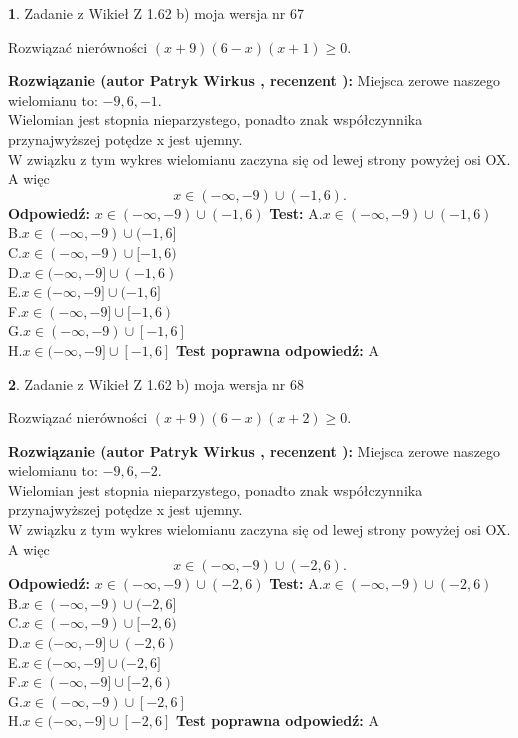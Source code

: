 \documentclass[12pt, a4paper]{article}
\theoremstyle{definition} %
\newtheorem{zad}{}
\newcommand{\zadStart}[1]{\begin{zad}#1\newline}
\newcommand{\zadStop}{\end{zad}}
\newcommand{\rozwStart}[2]{\noindent \textbf{Rozwiązanie (autor #1 , recenzent #2): }\newline}
\newcommand{\rozwStop}{\newline}
\newcommand{\odpStart}{\noindent \textbf{Odpowiedź:}\newline}
\newcommand{\odpStop}{\newline}
\newcommand{\testStart}{\noindent \textbf{Test:}\newline}
\newcommand{\testStop}{\newline}
\newcommand{\kluczStart}{\noindent \textbf{Test poprawna odpowiedź:}\newline}
\newcommand{\kluczStop}{\newline}
\begin{document}
\zadStart{Zadanie z Wikieł Z 1.62 b) moja wersja nr 67}

Rozwiązać nierówności $(x+9)(6-x)(x+1)\ge0$.
\zadStop
\rozwStart{Patryk Wirkus}{}
Miejsca zerowe naszego wielomianu to: $-9, 6, -1$.\\
Wielomian jest stopnia nieparzystego, ponadto znak współczynnika przy\linebreak najwyższej potędze x jest ujemny.\\ W związku z tym wykres wielomianu zaczyna się od lewej strony powyżej osi OX. A więc $$x \in (-\infty,-9) \cup (-1,6).$$
\rozwStop
\odpStart
$x \in (-\infty,-9) \cup (-1,6)$
\odpStop
\testStart
A.$x \in (-\infty,-9) \cup (-1,6)$\\
B.$x \in (-\infty,-9) \cup (-1,6]$\\
C.$x \in (-\infty,-9) \cup [-1,6)$\\
D.$x \in (-\infty,-9] \cup (-1,6)$\\
E.$x \in (-\infty,-9] \cup (-1,6]$\\
F.$x \in (-\infty,-9] \cup [-1,6)$\\
G.$x \in (-\infty,-9) \cup [-1,6]$\\
H.$x \in (-\infty,-9] \cup [-1,6]$
\testStop
\kluczStart
A
\kluczStop



\zadStart{Zadanie z Wikieł Z 1.62 b) moja wersja nr 68}

Rozwiązać nierówności $(x+9)(6-x)(x+2)\ge0$.
\zadStop
\rozwStart{Patryk Wirkus}{}
Miejsca zerowe naszego wielomianu to: $-9, 6, -2$.\\
Wielomian jest stopnia nieparzystego, ponadto znak współczynnika przy\linebreak najwyższej potędze x jest ujemny.\\ W związku z tym wykres wielomianu zaczyna się od lewej strony powyżej osi OX. A więc $$x \in (-\infty,-9) \cup (-2,6).$$
\rozwStop
\odpStart
$x \in (-\infty,-9) \cup (-2,6)$
\odpStop
\testStart
A.$x \in (-\infty,-9) \cup (-2,6)$\\
B.$x \in (-\infty,-9) \cup (-2,6]$\\
C.$x \in (-\infty,-9) \cup [-2,6)$\\
D.$x \in (-\infty,-9] \cup (-2,6)$\\
E.$x \in (-\infty,-9] \cup (-2,6]$\\
F.$x \in (-\infty,-9] \cup [-2,6)$\\
G.$x \in (-\infty,-9) \cup [-2,6]$\\
H.$x \in (-\infty,-9] \cup [-2,6]$
\testStop
\kluczStart
A
\kluczStop
\end{document}
